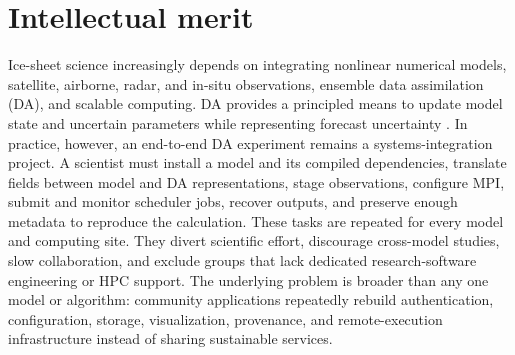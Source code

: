 \section{Intellectual merit}
\label{sec:IM}

Ice-sheet science increasingly depends on integrating nonlinear numerical
models, satellite, airborne, radar, and in-situ observations, ensemble data
assimilation (DA), and scalable computing. DA provides a principled means to
update model state and uncertain parameters while representing forecast uncertainty
\citep{evensen2003,gilletchaulet2020,choi2025}. In practice, however, an
end-to-end DA experiment remains a systems-integration project. A scientist
must install a model and its compiled dependencies, translate fields between
model and DA representations, stage observations, configure MPI, submit and
monitor scheduler jobs, recover outputs, and preserve enough metadata to
reproduce the calculation. These tasks are repeated for every model and
computing site. They divert scientific effort, discourage cross-model studies,
slow collaboration, and exclude groups that lack dedicated research-software
engineering or HPC support. The underlying problem is broader than any one
model or algorithm: community applications repeatedly rebuild authentication,
configuration, storage, visualization, provenance, and remote-execution
infrastructure instead of sharing sustainable services.

